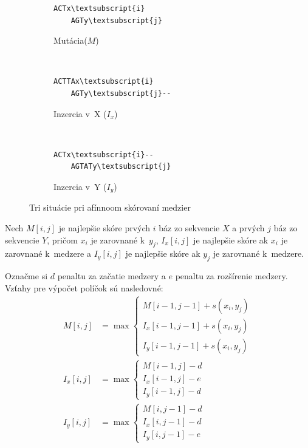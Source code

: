 \begin{figure}[htp]
    \centering
    \begin{subfigure}[m]{0.3\textwidth}
    \centering
    \begin{BVerbatim}[commandchars=\\\{\}]
    ACTx\textsubscript{i}
    AGTy\textsubscript{j}
    \end{BVerbatim}
    \caption{Mutácia($M$)}
    \end{subfigure}
    ~
    \begin{subfigure}[m]{0.3\textwidth}
    \centering
    \begin{BVerbatim}[commandchars=\\\{\}]
    ACTTAx\textsubscript{i}
    AGTy\textsubscript{j}--
    \end{BVerbatim}
    \caption{Inzercia v~X ($I_x$)}
    \end{subfigure}
    ~
    \begin{subfigure}[m]{0.3\textwidth}
    \centering
    \begin{BVerbatim}[commandchars=\\\{\}]
    ACTx\textsubscript{i}--
    AGTATy\textsubscript{j}
    \end{BVerbatim}
    \caption{Inzercia v~Y ($I_y$)}
    \end{subfigure}
    \caption[Situácie pri afínnoom skórovaní]{Tri situácie pri afínnoom skórovaní medzier}
    \label{fig:affine-space-situations}
\end{figure}

Nech $M[i,j]$ je najlepšie skóre prvých $i$ báz zo sekvencie $X$ a prvých $j$ báz zo sekvencie $Y$, pričom $x_i$ je zarovnané k~$y_j$, $I_x[i,j]$ je najlepšie skóre ak $x_i$ je zarovnané k~medzere a $I_y[i,j]$ je najlepšie skóre ak $y_j$ je zarovnané k~medzere.

Označme si $d$ penaltu za začatie medzery a $e$ penaltu za rozšírenie medzery. Vzťahy pre výpočet políčok sú nasledovné:
\begin{align*}
M[i,j] &= \max \left\{
\begin{array}{l}
M[i-1,j-1]+s(x_i, y_j)\\
I_x[i-1,j-1]+s(x_i, y_j)\\
I_y[i-1,j-1]+s(x_i, y_j)
\end{array} \right.\\
I_x[i,j] &= \max \left\{
\begin{array}{l}
M[i-1,j]-d\\
I_x[i-1,j]-e\\
I_y[i-1,j]-d
\end{array} \right.\\
I_y[i,j] &= \max \left\{
\begin{array}{l}
M[i,j-1]-d\\
I_x[i,j-1]-d\\
I_y[i,j-1]-e
\end{array} \right.
\end{align*}

